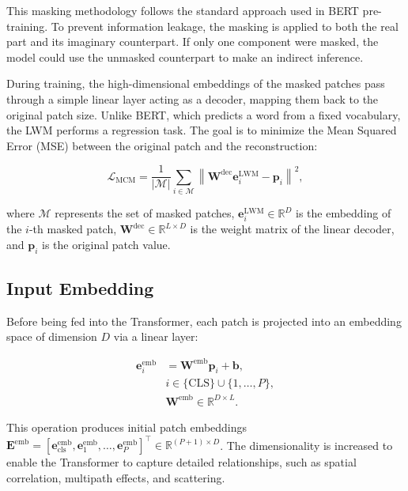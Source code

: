 This masking methodology follows the standard approach used in BERT pre-training. To prevent information leakage, the masking is applied to both the real part and its imaginary counterpart. If only one component were masked, the model could use the unmasked counterpart to make an indirect inference.

During training, the high-dimensional embeddings of the masked patches pass through a simple linear layer acting as a decoder, mapping them back to the original patch size. Unlike BERT, which predicts a word from a fixed vocabulary, the LWM performs a regression task. The goal is to minimize the Mean Squared Error (MSE) between the original patch and the reconstruction:

\begin{equation}
    \mathcal{L}_{\text{MCM}} = \frac{1}{|\mathcal{M}|} \sum_{i \in \mathcal{M}} \left\| \mathbf{W}^{\text{dec}} \mathbf{e}_i^{\text{LWM}} - \mathbf{p}_i \right\|^2,
\end{equation}

where $\mathcal{M}$ represents the set of masked patches, $\mathbf{e}_i^{\text{LWM}} \in \mathbb{R}^{D}$ is the embedding of the $i$-th masked patch, $\mathbf{W}^{\text{dec}} \in \mathbb{R}^{L \times D}$ is the weight matrix of the linear decoder, and $\mathbf{p}_i$ is the original patch value.

\subsection{Input Embedding}\label{sec:input_embedding}

Before being fed into the Transformer, each patch is projected into an embedding space of dimension $D$ via a linear layer:

\begin{equation}
    \begin{aligned}
        \mathbf{e}^{\text{emb}}_{i} &= \mathbf{W}^{\text{emb}} \mathbf{p}_{i} + \mathbf{b}, \\
        & i \in \{\text{CLS}\} \cup \{1, \dots, P\}, \\
        & \mathbf{W}^{\text{emb}} \in \mathbb{R}^{D \times L}.
    \end{aligned}
\end{equation}

This operation produces initial patch embeddings $\mathbf{E}^{\text{emb}} = [\mathbf{e}^{\text{emb}}_{\text{cls}}, \mathbf{e}^{\text{emb}}_{1}, \dots, \mathbf{e}^{\text{emb}}_{P}]^\top \in \mathbb{R}^{(P+1) \times D}$.
The dimensionality is increased to enable the Transformer to capture detailed relationships, such as spatial correlation, multipath effects, and scattering.

